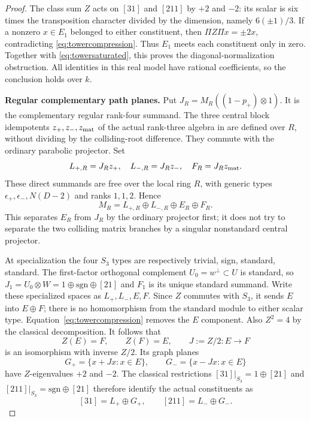 \begin{proof}
The class sum $Z$ acts on $[31]$ and $[211]$ by $+2$ and $-2$:
its scalar is six times the transposition character divided by the
dimension, namely $6(\pm1)/3$. If a nonzero $x\in E_1$ belonged
to either constituent, then $\Pi Z\Pi x=\pm2x$, contradicting
\eqref{eq:towercompression}. Thus $E_1$ meets each constituent only
in zero. Together with \eqref{eq:towersaturated}, this proves the
diagonal-normalization obstruction. All identities in this real
model have rational coefficients, so the conclusion holds over $k$.

\par\smallskip\noindent\textbf{Regular complementary path planes.}\quad
Put $J_R=M_R((1-p_+)\otimes1)$. It is the complementary regular
rank-four summand. The three central block idempotents
$z_+,z_-,z_{\rm mat}$ of the actual rank-three algebra in 
are defined over $R$, without dividing by the colliding-root
difference. They commute with the ordinary parabolic projector.
Set
\[
 L_{+,R}=J_Rz_+,\quad L_{-,R}=J_Rz_-,\quad F_R=J_Rz_{\rm mat}.
\]
These direct summands are free over the local ring $R$, with generic
types $\epsilon_+,\epsilon_-,N(D-2)$ and ranks $1,1,2$. Hence
\[
 M_R=L_{+,R}\oplus L_{-,R}\oplus E_R\oplus F_R.
\]
This separates $E_R$ from $J_R$ by the ordinary projector first;
it does not try to separate the two colliding matrix branches by a
singular nonstandard central projector.

At specialization the four $S_3$ types are respectively trivial,
sign, standard, standard. The first-factor orthogonal complement
$U_0=w^\perp\subset U$ is standard, so
$J_1=U_0\otimes W=1\oplus\mathrm{sgn}\oplus[21]$ and $F_1$
is its unique standard summand. Write these specialized spaces as
$L_+,L_-,E,F$. Since $Z$ commutes with $S_3$, it sends $E$ into
$E\oplus F$; there is no homomorphism from the standard module
to either scalar type. Equation~\eqref{eq:towercompression} removes
the $E$ component. Also $Z^2=4$ by the classical decomposition.
It follows that
\[
 Z(E)=F,\qquad Z(F)=E,\qquad J:=Z/2:E\longrightarrow F
\]
is an isomorphism with inverse $Z/2$. Its graph planes
\[
 G_+=\{x+Jx:x\in E\},\qquad G_-=\{x-Jx:x\in E\}
\]
have $Z$-eigenvalues $+2$ and $-2$. The classical restrictions
$[31]|_{S_3}=1\oplus[21]$ and
$[211]|_{S_3}=\mathrm{sgn}\oplus[21]$ therefore identify the
actual constituents as
\begin{equation}\label{eq:towergraphs}
 [31]=L_+\oplus G_+,\qquad [211]=L_-\oplus G_-.
\end{equation}


\end{proof}
